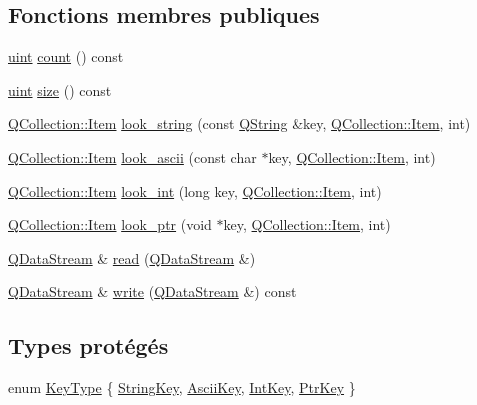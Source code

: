 \subsection*{Fonctions membres publiques}
\begin{DoxyCompactItemize}
\item 
\hyperlink{qglobal_8h_a4d3943ddea65db7163a58e6c7e8df95a}{uint} \hyperlink{class_q_g_dict_a6ed471c0ad36a2a66b5f65b6a5b78baf}{count} () const 
\item 
\hyperlink{qglobal_8h_a4d3943ddea65db7163a58e6c7e8df95a}{uint} \hyperlink{class_q_g_dict_a1306e6fd44670f39bef97380ddadbe14}{size} () const 
\item 
\hyperlink{class_q_collection_ac6f3ddbf999e31fb797927f71ae6b5d7}{Q\+Collection\+::\+Item} \hyperlink{class_q_g_dict_a1de8c35b775f7918acdf148b5df41fe4}{look\+\_\+string} (const \hyperlink{class_q_string}{Q\+String} \&key, \hyperlink{class_q_collection_ac6f3ddbf999e31fb797927f71ae6b5d7}{Q\+Collection\+::\+Item}, int)
\item 
\hyperlink{class_q_collection_ac6f3ddbf999e31fb797927f71ae6b5d7}{Q\+Collection\+::\+Item} \hyperlink{class_q_g_dict_a6ad3fe3b248746cb4689f884f36404a0}{look\+\_\+ascii} (const char $\ast$key, \hyperlink{class_q_collection_ac6f3ddbf999e31fb797927f71ae6b5d7}{Q\+Collection\+::\+Item}, int)
\item 
\hyperlink{class_q_collection_ac6f3ddbf999e31fb797927f71ae6b5d7}{Q\+Collection\+::\+Item} \hyperlink{class_q_g_dict_a4d517bb4a5a9d6257d6ffd60597f7621}{look\+\_\+int} (long key, \hyperlink{class_q_collection_ac6f3ddbf999e31fb797927f71ae6b5d7}{Q\+Collection\+::\+Item}, int)
\item 
\hyperlink{class_q_collection_ac6f3ddbf999e31fb797927f71ae6b5d7}{Q\+Collection\+::\+Item} \hyperlink{class_q_g_dict_a9ee35841e4c40a244c54cc7fcf519649}{look\+\_\+ptr} (void $\ast$key, \hyperlink{class_q_collection_ac6f3ddbf999e31fb797927f71ae6b5d7}{Q\+Collection\+::\+Item}, int)
\item 
\hyperlink{class_q_data_stream}{Q\+Data\+Stream} \& \hyperlink{class_q_g_dict_a698c24588a7688bd9c618c17ba2fd7bb}{read} (\hyperlink{class_q_data_stream}{Q\+Data\+Stream} \&)
\item 
\hyperlink{class_q_data_stream}{Q\+Data\+Stream} \& \hyperlink{class_q_g_dict_a352bb41fbce825fe4b597735786c369b}{write} (\hyperlink{class_q_data_stream}{Q\+Data\+Stream} \&) const 
\end{DoxyCompactItemize}
\subsection*{Types protégés}
\begin{DoxyCompactItemize}
\item 
enum \hyperlink{class_q_g_dict_a4eced3c3c4e5c52360bc2f1bab85412e}{Key\+Type} \{ \hyperlink{class_q_g_dict_a4eced3c3c4e5c52360bc2f1bab85412ead140f937b2bac9191158797d5bb6494e}{String\+Key}, 
\hyperlink{class_q_g_dict_a4eced3c3c4e5c52360bc2f1bab85412ea1ee8c337fd02e50fa9db09e7006b127c}{Ascii\+Key}, 
\hyperlink{class_q_g_dict_a4eced3c3c4e5c52360bc2f1bab85412eac649d632ed54834afac6ba8e0d2f4f90}{Int\+Key}, 
\hyperlink{class_q_g_dict_a4eced3c3c4e5c52360bc2f1bab85412ea62ea1b4e933ead2e77a3025e25cbb0a8}{Ptr\+Key}
 \}
\end{DoxyCompactItemize}
